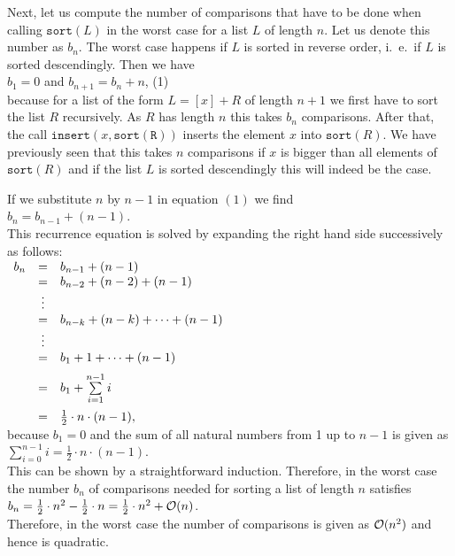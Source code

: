 Next, let us compute the number of comparisons that have to be done when calling
$\texttt{sort}(L)$ in the worst case for a list  $L$ of length $n$.  Let us denote this number as
$b_n$. The worst case happens if $L$ is sorted in reverse order, i.~e.~if $L$ is sorted
descendingly.   
Then we have \\[0.2cm]
\hspace*{1.3cm}
 $b_1 = 0$ \quad and \quad $b_{n+1} = b_n + n$, \hspace*{\fill} (1)
\\[0.2cm]
because for a list of the form $L = [x] + R$ of length $n+1$ we first have to sort the list $R$
recursively.  As $R$ has length $n$ this takes $b_n$ comparisons.  After that, the call
$\mathtt{insert}(x, \mathtt{sort(R)})$ 
inserts the element $x$ into $\mathtt{sort}(R)$.  We have previously seen that this takes $n$
comparisons if $x$ is bigger than all elements of $\mathtt{sort}(R)$ and if the list $L$ is sorted
descendingly this will indeed be the case.

If we substitute $n$ by $n-1$ in equation $(1)$ we find
\\[0.2cm]
\hspace*{1.3cm}
$b_n = b_{n-1} + (n - 1)$.
\\[0.2cm]
This recurrence equation is solved by expanding the right hand side successively as follows:
\\[0.2cm]
\hspace*{1.3cm}
$
\begin{array}[t]{lcl}
  b_{n} & = & b_{n-1} + (n - 1)                     \\ 
        & = & b_{n-2} + (n - 2) + (n - 1)           \\ 
        & \vdots &                                  \\
        & = & b_{n-k} + (n - k) + \cdots + (n - 1)  \\ 
        & \vdots &                                  \\
        & = & b_{1} + 1 + \cdots + (n - 1)      \\[0.2cm] 
        & = & b_{1} + \sum\limits_{i = 1}^{n - 1} i \\[0.4cm]
        & = & \frac{1}{2} \cdot n \cdot (n - 1),
\end{array}
$
\\[0.2cm]
because $b_1 = 0$ and the sum of all natural numbers from 1 up to  $n - 1$ is given as
\\[0.2cm]
\hspace*{1.3cm}
$\sum\limits_{i = 0}^{n - 1} i  = \frac{1}{2} \cdot n \cdot (n - 1)$.
\\[0.2cm]
This can be shown by a straightforward induction.  Therefore, in the worst case the number $b_n$ of
comparisons needed for sorting a list of length $n$  satisfies 
\\[0.2cm]
\hspace*{1.3cm}
$b_n = \frac{1}{2} \cdot n^2 - \frac{1}{2} \cdot n = \frac{1}{2} \cdot n^2 + \mathcal{O}(n)$.
\\[0.2cm]
Therefore, in the worst case the number of comparisons is given as $\mathcal{O}(n^2)$ and hence
 is quadratic.



